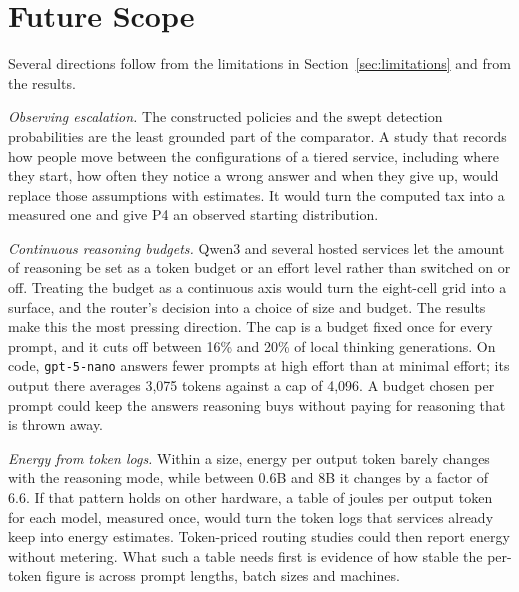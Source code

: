 \section{Future Scope}
\label{sec:future}

Several directions follow from the limitations in
Section~\ref{sec:limitations} and from the results.

\emph{Observing escalation.} The constructed policies and the swept
detection probabilities are the least grounded part of the comparator. A
study that records how people move between the configurations of a tiered
service, including where they start, how often they notice a wrong answer
and when they give up, would replace those assumptions with estimates. It
would turn the computed tax into a measured one and give P4 an observed
starting distribution.

\emph{Continuous reasoning budgets.} Qwen3 and several hosted services let
the amount of reasoning be set as a token budget or an effort level rather
than switched on or off. Treating the budget as a continuous axis would turn
the eight-cell grid into a surface, and the router's decision into a choice
of size and budget. The results make this the most pressing direction. The
cap is a budget fixed once for every prompt, and it cuts off between 16\%
and 20\% of local thinking generations. On code, \texttt{gpt-5-nano}
answers fewer prompts at high effort than at minimal effort; its output
there averages 3{,}075 tokens against a cap of 4{,}096. A budget chosen per prompt could keep the answers
reasoning buys without paying for reasoning that is thrown away.

\emph{Energy from token logs.} Within a size, energy per output token
barely changes with the reasoning mode, while between 0.6B and 8B it
changes by a factor of 6.6. If that pattern holds on other hardware, a
table of joules per output token for each model, measured once, would turn
the token logs that services already keep into energy estimates. Token-priced
routing studies could then report energy without metering. What such a
table needs first is evidence of how stable the per-token figure is across
prompt lengths, batch sizes and machines.

